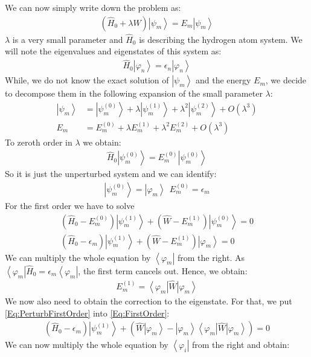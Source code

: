 \documentclass[10pt]{article}
\newcommand{\bra}[1]{\ensuremath{\left\langle#1\right|}}
\newcommand{\ket}[1]{\ensuremath{\left|#1\right\rangle}}
\newcommand{\Hzero}{\hat{H}_0}
\newcommand{\Wop}{\hat{W}}
\begin{document}
We can now simply write down the problem as:
\begin{eqnarray}
\left(\Hzero +\lambda \Wop\right)\ket{\psi_m} = E_m\ket{\psi_m}
\end{eqnarray}
$\lambda$ is a very small parameter and $\Hzero$ is describing the hydrogen atom  system. We will note the eigenvalues and eigenstates of this system as:
\begin{align}\label{Eq:EigsUnperturb}
\Hzero \ket{\varphi_n} = \epsilon_n \ket{\varphi_n}
\end{align}
While, we do not know the exact solution of $\ket{\psi_m}$ and the energy $E_m$, we decide to decompose them in the following expansion of the small parameter $\lambda$:
\begin{align}
\ket{\psi_m} &= \ket{\psi_m^{(0)}} + \lambda\ket{\psi_m^{(1)}}+\lambda^2\ket{\psi_m^{(2)}}+O(\lambda^3)\\
E_m &= E_m^{(0)} +\lambda E_m^{(1)} + \lambda^2 E_m^{(2)}+O(\lambda^3)\,
\end{align}
To zeroth order in $\lambda$ we obtain:
\begin{eqnarray}
\Hzero \ket{\psi_m^{(0)}} = E_m^{(0)}\ket{\psi_m^{(0)}}
\end{eqnarray}
So it is just the unperturbed system and we can identify:
\begin{eqnarray}
\ket{\psi_m^{(0)}} = \ket{\varphi_m}~~E_m^{(0)} = \epsilon_m
\end{eqnarray}
For the first order we have to solve
\begin{eqnarray}\label{Eq:FirstOrder}
(\Hzero-E_m^{(0)}) \ket{\psi_m^{(1)}} + (\Wop-E_m^{(1)})\ket{\psi_m^{(0)}}= 0\\
(\Hzero-\epsilon_m) \ket{\psi_m^{(1)}} + (\Wop-E_m^{(1)})\ket{\varphi_m}= 0
\end{eqnarray}
We can multiply the whole equation by $\bra{\varphi_m}$ from the right. As $\bra{\varphi_m}\Hzero = \epsilon_m\bra{\varphi_m}$, the first term cancels out. Hence, we obtain:
\begin{eqnarray}\label{Eq:PerturbFirstOrder}
\boxed{E_m^{(1)} = \bra{\varphi_m}\Wop\ket{\varphi_m}}
\end{eqnarray}
We now also need to obtain the correction to the eigenstate. For that, we put \eqref{Eq:PerturbFirstOrder} into \eqref{Eq:FirstOrder}:
\begin{eqnarray}
(\Hzero-\epsilon_m) \ket{\psi_m^{(1)}} + (\Wop\ket{\varphi_m}-\ket{\varphi_m}\bra{\varphi_m}\Wop\ket{\varphi_m})= 0
\end{eqnarray}
We can now multiply the whole equation by $\bra{\varphi_i}$ from the right and obtain:
\end{document}
